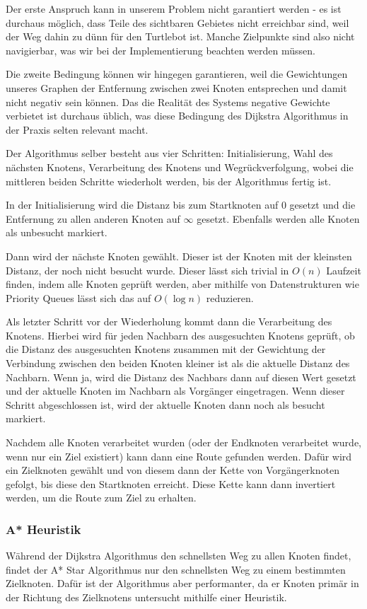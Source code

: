 Der erste Anspruch kann in unserem Problem nicht garantiert werden - es ist durchaus möglich, dass Teile des sichtbaren
Gebietes nicht erreichbar sind, weil der Weg dahin zu dünn für den Turtlebot ist.
Manche Zielpunkte sind also nicht navigierbar, was wir bei der Implementierung beachten werden müssen.

Die zweite Bedingung können wir hingegen garantieren, weil die Gewichtungen unseres Graphen der Entfernung zwischen
zwei Knoten entsprechen und damit nicht negativ sein können.
Das die Realität des Systems negative Gewichte verbietet ist durchaus üblich, was diese Bedingung des Dijkstra Algorithmus
in der Praxis selten relevant macht.



Der Algorithmus selber besteht aus vier Schritten: Initialisierung, Wahl des nächsten Knotens, Verarbeitung des Knotens und Wegrückverfolgung,
wobei die mittleren beiden Schritte wiederholt werden, bis der Algorithmus fertig ist.

In der Initialisierung wird die Distanz bis zum Startknoten auf 0 gesetzt und die Entfernung zu allen anderen Knoten auf
$\infty$ gesetzt.
Ebenfalls werden alle Knoten als unbesucht markiert.

Dann wird der nächste Knoten gewählt.
Dieser ist der Knoten mit der kleinsten Distanz, der noch nicht besucht wurde.
Dieser lässt sich trivial in $O(n)$ Laufzeit finden, indem alle Knoten geprüft werden, aber mithilfe von Datenstrukturen
wie Priority Queues lässt sich das auf $O(\log n)$ reduzieren.

Als letzter Schritt vor der Wiederholung kommt dann die Verarbeitung des Knotens.
Hierbei wird für jeden Nachbarn des ausgesuchten Knotens geprüft, ob die Distanz des ausgesuchten Knotens zusammen mit der
Gewichtung der Verbindung zwischen den beiden Knoten kleiner ist als die aktuelle Distanz des Nachbarn.
Wenn ja, wird die Distanz des Nachbars dann auf diesen Wert gesetzt und der aktuelle Knoten im Nachbarn als Vorgänger
eingetragen.
Wenn dieser Schritt abgeschlossen ist, wird der aktuelle Knoten dann noch als besucht markiert.

Nachdem alle Knoten verarbeitet wurden (oder der Endknoten verarbeitet wurde, wenn nur ein Ziel existiert) kann dann eine
Route gefunden werden.
Dafür wird ein Zielknoten gewählt und von diesem dann der Kette von Vorgängerknoten gefolgt, bis diese den Startknoten
erreicht.
Diese Kette kann dann invertiert werden, um die Route zum Ziel zu erhalten.
\subsubsection{A* Heuristik}
Während der Dijkstra Algorithmus den schnellsten Weg zu allen Knoten findet, findet der A* Star Algorithmus nur den
schnellsten Weg zu einem bestimmten Zielknoten.
Dafür ist der Algorithmus aber performanter, da er Knoten primär in der Richtung des Zielknotens untersucht mithilfe
einer Heuristik.

